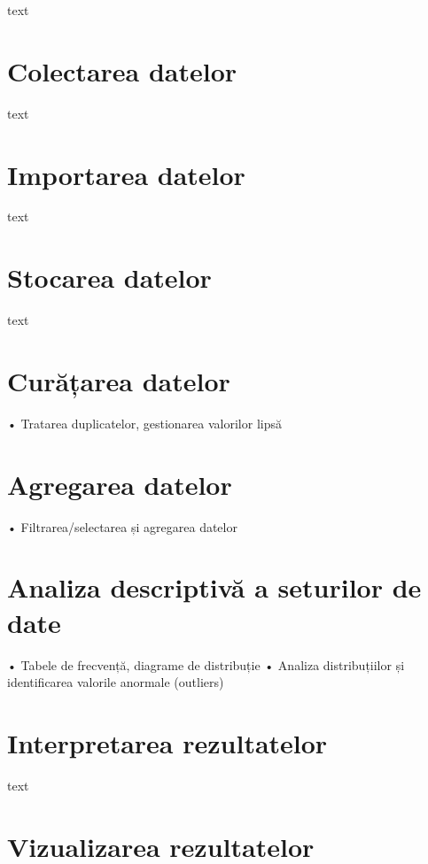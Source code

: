 \documentclass[
  11pt,
  b5paper,
  nottoc]{book}
\begin{document}
text

\section{Colectarea datelor}\label{colectarea-datelor}

text

\section{Importarea datelor}\label{importarea-datelor}

text

\section{Stocarea datelor}\label{stocarea-datelor}

text

\section{Curățarea datelor}\label{curux103ux21barea-datelor}

• Tratarea duplicatelor, gestionarea valorilor lipsă

\section{Agregarea datelor}\label{agregarea-datelor}

• Filtrarea/selectarea și agregarea datelor

\section{Analiza descriptivă a seturilor de
date}\label{analiza-descriptivux103-a-seturilor-de-date}

• Tabele de frecvență, diagrame de distribuție • Analiza distribuțiilor
și identificarea valorile anormale (outliers)

\section{Interpretarea rezultatelor}\label{interpretarea-rezultatelor}

text

\section{Vizualizarea rezultatelor}\label{vizualizarea-rezultatelor}
\end{document}
